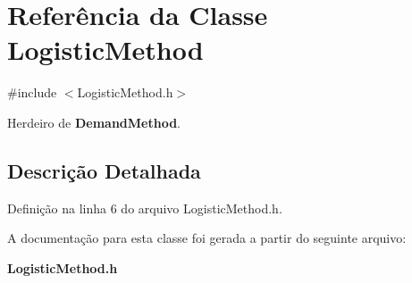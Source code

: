 \section{Referência da Classe Logistic\+Method}
\label{class_logistic_method}


{\ttfamily \#include $<$Logistic\+Method.\+h$>$}



Herdeiro de {\bf Demand\+Method}.



\subsection{Descrição Detalhada}


Definição na linha 6 do arquivo Logistic\+Method.\+h.



A documentação para esta classe foi gerada a partir do seguinte arquivo\+:\begin{DoxyCompactItemize}
\item 
{\bf Logistic\+Method.\+h}\end{DoxyCompactItemize}
